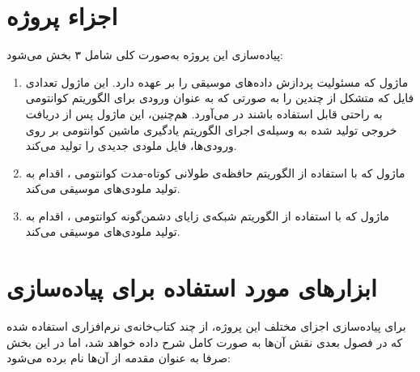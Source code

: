 \section{اجزاء پروژه}
پیاده‌سازی این پروژه به‌صورت کلی شامل ۳ بخش می‌شود:
\begin{enumerate}
    \item ماژول
    که مسئولیت پردازش داده‌های موسیقی را بر عهده دارد. این ماژول تعدادی فایل که متشکل از چندین  را به صورتی که به عنوان ورودی برای الگوریتم کوانتومی به راحتی قابل استفاده باشند در می‌آورد. هم‌چنین، این ماژول پس از دریافت خروجی تولید شده به وسیله‌ی اجرای الگوریتم یادگیری ماشین کوانتومی بر روی ورودی‌ها، فایل ملودی جدیدی را تولید می‌کند.
    \item ماژول
    که با استفاده از الگوریتم حافظه‌ی طولانی کوتاه-مدت کوانتومی
    \cite{chen_qlstm}
    ، اقدام به تولید ملودی‌های موسیقی می‌کند.
    
    \item ماژول
    که با استفاده از الگوریتم شبکه‌ی زایای دشمن‌گونه کوانتومی
    \cite{lloyd_qugan} \cite{zoufal_qugan}
    ، اقدام به تولید ملودی‌های موسیقی می‌کند.

\end{enumerate}

\section{ابزارهای مورد استفاده برای پیاده‌سازی}

برای پیاده‌سازی اجزای مختلف این پروژه، از چند کتاب‌خانه‌ی نرم‌افزاری استفاده شده که در فصول بعدی نقش آن‌ها به صورت کامل شرح داده خواهد شد، اما در این بخش صرفا به عنوان مقدمه از آن‌ها نام برده می‌شود:
